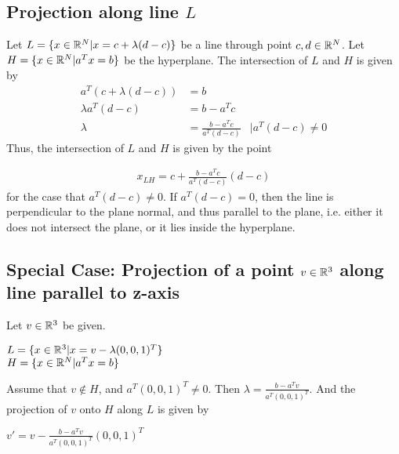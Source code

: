 \documentclass{article}
\begin{document}
\subsection{Projection along line $L$}

Let $L=\{x \in \mathbb{R}^N| x = c + \lambda (d-c)\}$ be a line through point $c,d \in
\mathbb{R}^N$. Let $H=\{x\in \mathbb{R}^N| a^Tx=b\}$ be the hyperplane. The intersection of $L$
and $H$ is given by
\begin{equation}
        \begin{aligned}
                a^T(c+\lambda(d-c)) &= b\\
                   \lambda a^T(d-c) &= b - a^Tc\\
                            \lambda &= \frac{b-a^Tc}{a^T(d-c)} &|a^T(d-c)\neq 0
        \end{aligned}
\end{equation}
Thus, the intersection of $L$ and $H$ is given by the point 

\begin{equation}
        \begin{aligned}
                x_{LH} = c + \frac{b-a^Tc}{a^T(d-c)} (d-c)
        \end{aligned}
\end{equation}
for the case that $a^T(d-c)\neq 0$. If
$a^T(d-c)=0$, then the line is perpendicular to the plane normal, and thus
parallel to the plane, i.e. either it does not intersect the plane, or it lies
inside the hyperplane.

\subsection{Special Case: Projection of a point $v \in \mathbb{R}^3$ along line parallel to
z-axis}
Let $v \in \mathbb{R}^3$ be given. 
\begin{center}
     $L=\{x \in \mathbb{R}^3| x = v - \lambda (0,0,1)^T\}$\\
        $H=\{x\in \mathbb{R}^N| a^Tx=b\}$
\end{center}
Assume that $v \not\in H$, and $a^T(0,0,1)^T \neq 0$. Then $\lambda =
\frac{b-a^Tv}{a^T(0,0,1)^T}$. And the projection of $v$ onto $H$ along $L$ is
given by
\begin{center}
        $v' = v - \frac{b-a^Tv}{a^T(0,0,1)^T}(0,0,1)^T$
\end{center}
\end{document}
